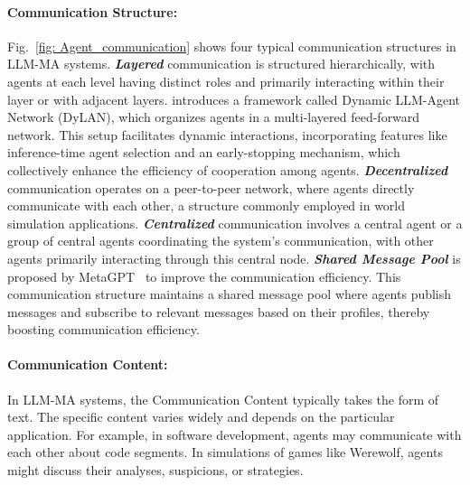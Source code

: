 \paragraph{Communication Structure:} %
Fig.~\ref{fig: Agent_communication} shows {four} typical communication structures in LLM-MA systems. 
\emph{\textbf{Layered}} communication is structured hierarchically, with agents at each level having distinct roles and primarily interacting within their layer or with adjacent layers. \cite{liu2023dynamic} introduces a framework called Dynamic LLM-Agent Network (DyLAN), which organizes agents in a multi-layered feed-forward network. This setup facilitates dynamic interactions, incorporating features like inference-time agent selection and an early-stopping mechanism, which collectively enhance the efficiency of cooperation among agents. 
\emph{\textbf{Decentralized}} communication operates on a peer-to-peer network, where agents directly communicate with each other, a structure commonly employed in world simulation applications.
\emph{\textbf{Centralized}} communication involves a central agent or a group of central agents coordinating the system's communication, with other agents primarily interacting through this central node.
{\emph{\textbf{Shared Message Pool}} is proposed by MetaGPT~\cite{hong2023metagpt} to improve the communication efficiency. This communication structure maintains a shared message pool where agents publish messages and subscribe to relevant messages based on their profiles, thereby boosting communication efficiency.}

\paragraph{Communication Content:} %
In LLM-MA systems, the Communication Content typically takes the form of text. The specific content varies widely and  depends on the particular application. For example, in software development, agents may communicate with each other about code segments. In simulations of games like Werewolf,  agents might discuss their analyses, suspicions, or strategies.  

